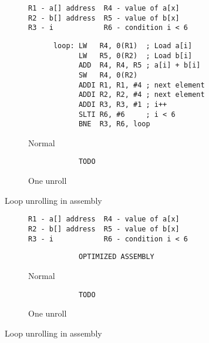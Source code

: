 \begin{figure}
    \centering
    \begin{subfigure}{6cm}
        \centering
        \begin{verbatim}
R1 - a[] address  R4 - value of a[x]
R2 - b[] address  R5 - value of b[x]
R3 - i            R6 - condition i < 6
        \end{verbatim}
    \end{subfigure}
    \begin{subfigure}{.5\textwidth}
        \centering
        \begin{verbatim}
      loop: LW   R4, 0(R1)  ; Load a[i]
            LW   R5, 0(R2)  ; Load b[i]
            ADD  R4, R4, R5 ; a[i] + b[i]
            SW   R4, 0(R2)
            ADDI R1, R1, #4 ; next element
            ADDI R2, R2, #4 ; next element
            ADDI R3, R3, #1 ; i++
            SLTI R6, #6     ; i < 6
            BNE  R3, R6, loop
        \end{verbatim}
        \caption{Normal}
        \label{fig:sub1}
    \end{subfigure}%
    \begin{subfigure}{.5\textwidth}
        \centering
        \begin{verbatim}
            TODO
        \end{verbatim}
        \caption{One unroll}
        \label{fig:sub2}
    \end{subfigure}
    \caption{Loop unrolling in assembly}
    \label{fig:assembly:unroll}
\end{figure}

\begin{figure}
    \centering
    \begin{subfigure}{6cm}
        \centering
        \begin{verbatim}
R1 - a[] address  R4 - value of a[x]
R2 - b[] address  R5 - value of b[x]
R3 - i            R6 - condition i < 6
        \end{verbatim}
    \end{subfigure}
    \begin{subfigure}{.5\textwidth}
        \centering
        \begin{verbatim}
            OPTIMIZED ASSEMBLY
        \end{verbatim}
        \caption{Normal}
        \label{fig:sub1}
    \end{subfigure}%
    \begin{subfigure}{.5\textwidth}
        \centering
        \begin{verbatim}
            TODO
        \end{verbatim}
        \caption{One unroll}
        \label{fig:sub2}
    \end{subfigure}
    \caption{Loop unrolling in assembly}
    \label{fig:assembly:optimized}
\end{figure}

